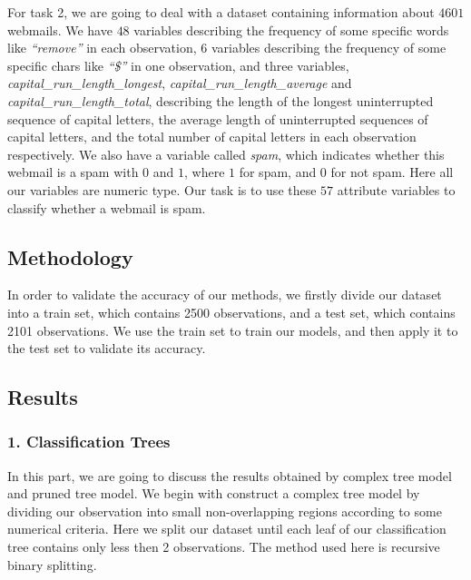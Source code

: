 \documentclass[
  11pt,
]{article}
\begin{document}
For task 2, we are going to deal with a dataset containing information about \(4601\) webmails. We have \(48\) variables describing the frequency of some specific words like \emph{``remove''} in each observation, \(6\) variables describing the frequency of some specific chars like \emph{``\$''} in one observation, and three variables, \emph{capital\_run\_length\_longest}, \emph{capital\_run\_length\_average} and \emph{capital\_run\_length\_total}, describing the length of the longest uninterrupted sequence of capital letters, the average length of uninterrupted sequences of capital letters, and the total number of capital letters in each observation respectively. We also have a variable called \emph{spam}, which indicates whether this webmail is a spam with \(0\) and \(1\), where \(1\) for spam, and \(0\) for not spam. Here all our variables are numeric type.
Our task is to use these \(57\) attribute variables to classify whether a webmail is spam.

\hypertarget{methodology-1}{%
\subsection{Methodology}\label{methodology-1}}

In order to validate the accuracy of our methods, we firstly divide our dataset into a train set, which contains 2500 observations, and a test set, which contains 2101 observations. We use the train set to train our models, and then apply it to the test set to validate its accuracy.

\hypertarget{results}{%
\subsection{Results}\label{results}}

\hypertarget{classification-trees}{%
\subsubsection{1. Classification Trees}\label{classification-trees}}

In this part, we are going to discuss the results obtained by complex tree model and pruned tree model.
We begin with construct a complex tree model by dividing our observation into small non-overlapping regions according to some numerical criteria. Here we split our dataset until each leaf of our classification tree contains only less then 2 observations. The method used here is recursive binary splitting.
\end{document}

